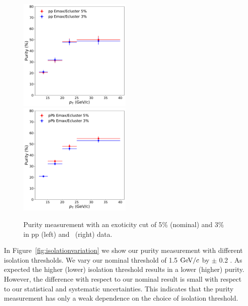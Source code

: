 \begin{figure}
	\center
	\includegraphics[width=0.495\textwidth]{Appendices/ppemax.pdf}
	\includegraphics[width=0.495\textwidth]{Appendices/ppbemax.pdf}
	\caption{Purity measurement with an exoticity cut of 5$\%$ (nominal) and 3$\%$ in pp (left) and \pPb~(right) data.}
	\label{fig:exoticity}
\end{figure}

In Figure~\ref{fig:isolationvariation} we show our purity measurement with different isolation thresholds. We vary our nominal threshold of 1.5 $\mathrm{GeV}/c$ by $\pm$ 0.2 \GeVc. As expected the higher (lower) isolation threshold results in a lower (higher) purity. However, the difference with respect to our nominal result is small with respect to our statistical and systematic uncertainties. This indicates that the purity measurement has only a weak dependence on the choice of isolation threshold. 



